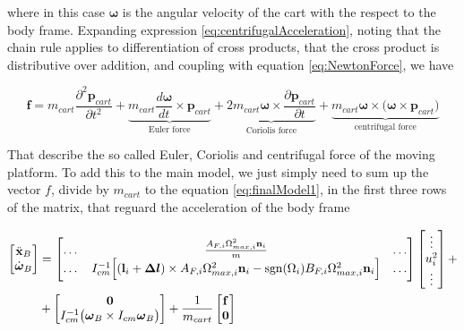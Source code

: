 \noindent where in this case $\boldsymbol{\omega}$ is the angular velocity of the cart with the respect to the body frame. Expanding expression \eqref{eq:centrifugalAcceleration}, noting that the chain rule applies to differentiation of cross products, that the cross product is distributive over addition, and coupling with equation \eqref{eq:NewtonForce}, we have

\begin{equation}
	\mathbf{f}=m_{cart}\frac{\partial^2\mathbf{p}_{cart}}{\partial t^2}+\underbrace{m_{cart}\frac{d\boldsymbol{\omega}}{dt}\times\mathbf{p}_{cart}}_{\text{Euler force}}+\underbrace{2m_{cart}\boldsymbol{\omega}\times\frac{\partial\mathbf{p}_{cart}}{\partial t}}_{\text{Coriolis force}}+\underbrace{m_{cart}\boldsymbol{\omega}\times\bigl(\boldsymbol{\omega}\times\mathbf{p}_{cart}\bigl)}_{\text{centrifugal force}}
\end{equation}

\noindent That describe the so called Euler, Coriolis and centrifugal force of the moving platform. To add this to the main model, we just simply need to sum up the vector $f$, divide by $m_{cart}$ to the equation \eqref{eq:finalModel1}, in the first three rows of the matrix, that reguard the acceleration of the body frame

\begin{equation}
	\begin{split}
		\begin{bmatrix}
			\ddot{\mathbf{x}}_B \\
			\dot{\boldsymbol{\omega}}_B
		\end{bmatrix}
		&=
		\begin{bmatrix}
			\dots & \frac{A_{F,i}\Omega_{max,i}^2\mathbf{n}_i}{m} & \dots \\
			\dots & I_{cm}^{-1}\Big[ (\mathbf{l}_i+\boldsymbol{\Delta l})\times A_{F,i}\Omega^2_{max,i}\mathbf{n}_i-\operatorname*{sgn}(\Omega_i)B_{F,i}\Omega_{max,i}^2\mathbf{n}_i\Big] & \dots
		\end{bmatrix}
		\begin{bmatrix}
			\vdots \\
			u_i^2 \\
			\vdots
		\end{bmatrix}
		+ \\
		&+
		\begin{bmatrix}
			\mathbf{0} \\
			I_{cm}^{-1}\bigl(\boldsymbol{\omega}_B \times I_{cm} \boldsymbol{\omega}_B \bigl)
		\end{bmatrix} 
		+
		\frac{1}{m_{cart}}
		\begin{bmatrix}
		\mathbf{f} \\
		\mathbf{0}
		\end{bmatrix}
	\end{split}
	\label{eq:finalModelCart}
\end{equation}


